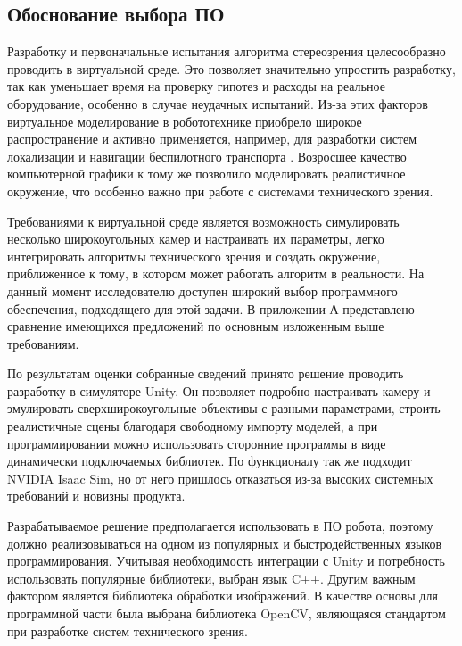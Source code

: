 \subsection{Обоснование выбора ПО}
\label{sec:software}
Разработку и первоначальные испытания алгоритма стереозрения целесообразно проводить в виртуальной среде. Это позволяет значительно упростить разработку, 
так как уменьшает время на проверку гипотез и расходы на реальное оборудование, особенно в случае неудачных испытаний. Из-за этих факторов виртуальное моделирование 
в робототехнике приобрело широкое распространение и активно применяется, например, для разработки систем локализации и навигации беспилотного транспорта \cite{simulations}. 
Возросшее качество компьютерной графики к тому же позволило моделировать реалистичное окружение, что особенно важно при работе с системами технического зрения. 

Требованиями к виртуальной среде является возможность симулировать несколько широкоугольных камер и настраивать их параметры, 
легко интегрировать алгоритмы технического зрения и создать окружение, приближенное к тому, в котором может работать алгоритм в реальности. На данный момент исследователю доступен 
широкий выбор программного обеспечения, подходящего для этой задачи. В приложении А представлено сравнение имеющихся предложений по основным изложенным выше 
требованиям.

По результатам оценки собранные сведений принято решение проводить разработку в симуляторе Unity. Он позволяет подробно настраивать камеру и эмулировать сверхширокоугольные объективы 
с разными параметрами, строить реалистичные сцены благодаря свободному импорту моделей, а при программировании можно использовать сторонние программы в виде динамически подключаемых библиотек. 
По функционалу так же подходит NVIDIA Isaac Sim, но от него пришлось отказаться из-за высоких системных требований и новизны продукта.    

Разрабатываемое решение предполагается использовать в ПО робота, %
поэтому должно реализовываться на одном из популярных и быстродейственных языков программирования. Учитывая необходимость интеграции с Unity и потребность использовать популярные 
библиотеки, выбран язык C++.  Другим важным фактором является библиотека обработки изображений. В качестве основы для программной части была выбрана библиотека OpenCV, 
являющаяся стандартом при разработке систем технического зрения. 

\vspace{\baselineskip}